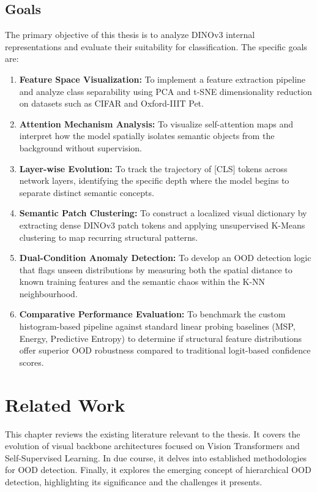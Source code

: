 \documentclass[oneside]{ctuthesis}
\begin{document}
\section{Goals}
\label{sec:goals}

The primary objective of this thesis is to analyze DINOv3 internal representations and evaluate their suitability for classification. The specific goals are:

\begin{enumerate}
    \item \textbf{Feature Space Visualization:} To implement a feature extraction pipeline and analyze class separability using PCA and t-SNE dimensionality reduction on datasets such as CIFAR and Oxford-IIIT Pet.
    
    \item \textbf{Attention Mechanism Analysis:} To visualize self-attention maps and interpret how the model spatially isolates semantic objects from the background without supervision.
    
    \item \textbf{Layer-wise Evolution:} To track the trajectory of [CLS] tokens across network layers, identifying the specific depth where the model begins to separate distinct semantic concepts.

    \item \textbf{Semantic Patch Clustering:} To construct a localized visual dictionary by extracting dense DINOv3 patch tokens and applying unsupervised K-Means clustering to map recurring structural patterns.
    
    \item \textbf{Dual-Condition Anomaly Detection:} To develop an OOD detection logic that flags unseen distributions by measuring both the spatial distance to known training features and the semantic chaos within the K-NN neighbourhood.
    
    \item \textbf{Comparative Performance Evaluation:} To benchmark the custom histogram-based pipeline against standard linear probing baselines (MSP, Energy, Predictive Entropy) to determine if structural feature distributions offer superior OOD robustness compared to traditional logit-based confidence scores.
\end{enumerate}


\chapter{Related Work}
\label{related_work}
This chapter reviews the existing literature relevant to the thesis. It covers the evolution of visual backbone architectures focused on Vision Transformers and Self-Supervised Learning. 
In due course, it delves into established methodologies for OOD detection. 
Finally, it explores the emerging concept of hierarchical OOD detection, highlighting its significance and the challenges it presents.
\end{document}
